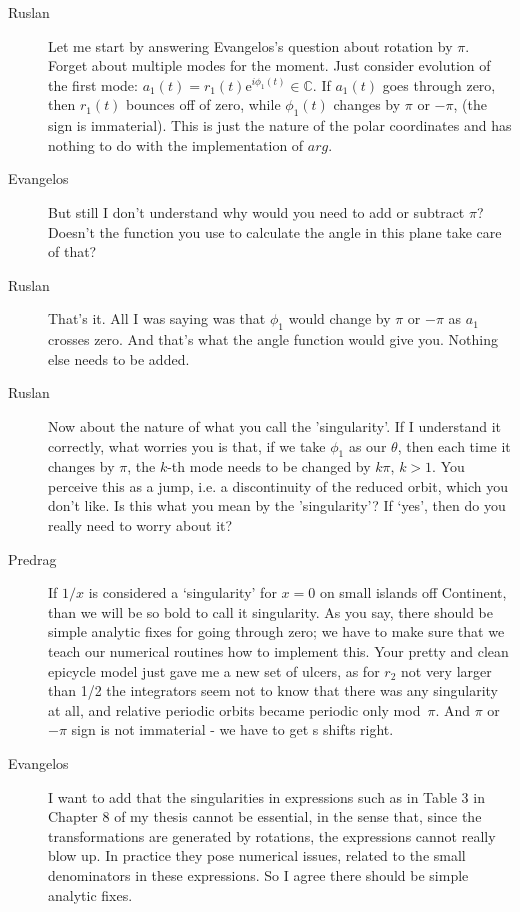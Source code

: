 \begin{description}
\item[Ruslan]
    Let me start by answering Evangelos's question about rotation
by $\pi$.  Forget about multiple modes for the moment.  Just
consider evolution of the first mode: $a_1(t) =
r_1(t)\mathrm{e}^{i\phi_1(t)} \in \mathbb{C}$.  If $a_1(t)$
goes through zero, then $r_1(t)$ bounces off of zero, while
$\phi_1(t)$ changes by $\pi$ or $-\pi$, (the sign is
immaterial).   This is just the nature of the polar
coordinates and has nothing to do with the implementation of
$arg$.

\item[Evangelos]
But still I don't understand why would you need to add or subtract
$\pi$? Doesn't the function you use to calculate the angle in this
plane take care of that?

\item[Ruslan]
That's it.  All I was saying
was that $\phi_1$ would change by $\pi$ or $-\pi$ as $a_1$
crosses zero.  And that's what the angle function would give
you.  Nothing else needs to be added.

\item[Ruslan]
Now about the nature of what you call the 'singularity'.  If
I understand it correctly, what worries you is that, if we
take $\phi_1$ as our $\theta$, then each time it changes by
$\pi$, the $k$-th mode needs to be changed by $k\pi$, $k >
1$.  You perceive this as a jump, i.e. a discontinuity of the
reduced orbit, which you don't like.  Is this what you mean
by the 'singularity'? If `yes', then do you really need to
worry about it?

\item[Predrag]
If $1/x$ is considered a
`singularity' for $x=0$ on small islands off Continent, than
we will be so bold to call it singularity. As you say, there
should be simple analytic fixes for going through zero; we
have to make sure that we teach our numerical routines how to
implement this. Your pretty and clean epicycle model just
gave me a new set of ulcers, as for $r_2$ not very larger
than 1/2 the integrators seem not to know that there was any
singularity at all, and relative periodic orbits became
periodic only mod~$\pi$. And $\pi$ or $-\pi$  sign is not
immaterial - we have to get \rpo s shifts right.

\item[Evangelos]
I want to add that the singularities in expressions such as
in Table 3 in Chapter 8 of my
thesis cannot be essential, in the sense that, since the transformations
are generated by rotations, the expressions
cannot really blow up. In practice they pose numerical issues,
related to the small denominators in these expressions. So I agree there
should be simple analytic fixes.


\end{description}
